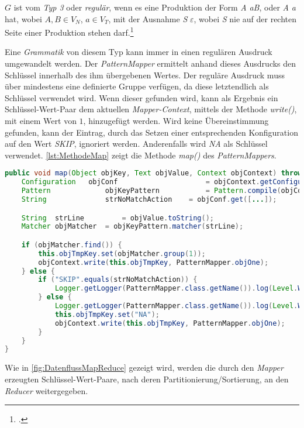 $G$ ist vom \textit{Typ 3} oder \textit{regulär}, wenn es eine Produktion der Form \textit{A} \textrightarrow \textit{aB}, oder \textit{A} \textrightarrow \textit{a} hat, wobei $A, B \in V_N$, $a \in V_T$, mit der Ausnahme \textit{S} \textrightarrow $\varepsilon$, wobei \textit{S} nie auf der rechten Seite einer Produktion stehen darf.\footcite[Vgl.][S. 25 u. 32]{Hedtstueck.2012}

Eine \textit{Grammatik} von diesem Typ kann immer in einen regulären Ausdruck umgewandelt werden. Der \textit{PatternMapper} ermittelt anhand dieses Ausdrucks den Schlüssel innerhalb des ihm übergebenen Wertes. Der reguläre Ausdruck muss über mindestens eine definierte Gruppe verfügen, da diese letztendlich als Schlüssel verwendet wird. Wenn dieser gefunden wird, kann als Ergebnis ein Schlüssel-Wert-Paar dem aktuellen \textit{Mapper-Context}, mittels der Methode \textit{write()}, mit einem Wert von $1$, hinzugefügt werden. Wird keine Übereinstimmung gefunden, kann der Eintrag, durch das Setzen einer entsprechenden Konfiguration auf den Wert \textit{SKIP}, ignoriert werden. Anderenfalls wird \textit{NA} als Schlüssel verwendet. \autoref{lst:MethodeMap} zeigt die Methode \textit{map()} des \textit{PatternMappers}. \\

\begin{lstlisting}[language=Java,caption=Methode \textit{map()} der Klasse \textit{PatternMapper},label=lst:MethodeMap]
public void map(Object objKey, Text objValue, Context objContext) throws IOException, InterruptedException {
	Configuration	objConf						= objContext.getConfiguration();
	Pattern				objKeyPattern			= Pattern.compile(objConf.get([...]));
	String				strNoMatchAction	= objConf.get([...]);

	String 	strLine 		= objValue.toString();
	Matcher	objMatcher	= objKeyPattern.matcher(strLine);

	if (objMatcher.find()) {
		this.objTmpKey.set(objMatcher.group(1));
		objContext.write(this.objTmpKey, PatternMapper.objOne);
	} else {
		if ("SKIP".equals(strNoMatchAction)) {
			Logger.getLogger(PatternMapper.class.getName()).log(Level.WARNING, [...]);
		} else {
			Logger.getLogger(PatternMapper.class.getName()).log(Level.WARNING, [...]);
			this.objTmpKey.set("NA");
			objContext.write(this.objTmpKey, PatternMapper.objOne);
		}
	}
}
\end{lstlisting}

Wie in \autoref{fig:DatenflussMapReduce} gezeigt wird, werden die durch den \textit{Mapper} erzeugten Schlüssel-Wert-Paare, nach deren Partitionierung/Sortierung, an den \textit{Reducer} weitergegeben.

